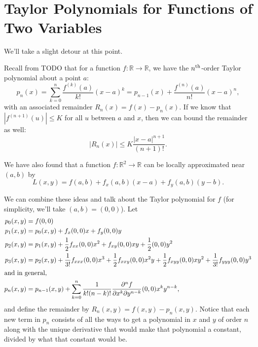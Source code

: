 \documentclass{amsart}
\newcommand{\BBR}{\mathbb{R}}
\newcommand{\abs}[1]{\left\lvert#1\right\rvert}
\begin{document}
\section*{Taylor Polynomials for Functions of Two Variables}

We'll take a slight detour at this point.

Recall from TODO that for a function $f:\BBR\to\BBR$, we have the $n\textsuperscript{th}$-order Taylor polynomial about a point $a$:
\[
 p_n(x)
 =\sum_{k=0}^n\frac{f^{(k)}(a)}{k!}(x-a)^k
 =p_{n-1}(x)+\frac{f^{(n)}(a)}{n!}(x-a)^n,
\]
with an associated remainder $R_n(x)=f(x)-p_n(x)$.  If we know that $\abs{f^{(n+1)}(u)}\le K$ for all $u$ between $a$ and $x$, then we can bound the remainder as well:
\[\abs{R_n(x)}\le K\frac{\abs{x-a}^{n+1}}{(n+1)!}.\]

We have also found that a function $f\colon\BBR^2\to\BBR$ can be locally approximated near $(a,b)$ by
\[ L(x,y)=f(a,b)+f_x(a,b)(x-a)+f_y(a,b)(y-b). \]

We can combine these ideas and talk about the Taylor polynomial for $f$ (for simplicity, we'll take $(a,b)=(0,0)$). Let
\begin{align*}
 p_0(x,y)&=f(0,0) \\
 p_1(x,y)&=p_0(x,y)+f_x(0,0)x+f_y(0,0)y \\
 p_2(x,y)&=p_1(x,y)+\frac12f_{xx}(0,0)x^2+f_{xy}(0,0)xy+\frac12(0,0)y^2 \\
 p_3(x,y)&=p_2(x,y)+\frac1{3!}f_{xxx}(0,0)x^3+\frac12f_{xxy}(0,0)x^2y
 +\frac12f_{xyy}(0,0)xy^2+\frac1{3!}f_{yyy}(0,0)y^3 \\
 \intertext{and in general,}
 p_n(x,y)&=p_{n-1}(x,y)+\sum_{k=0}^n\frac1{k!(n-k)!}
 \frac{\partial^n f}{\partial x^k\partial y^{n-k}}(0,0)x^k y^{n-k},
\end{align*}
and define the remainder by $R_n(x,y)=f(x,y)-p_n(x,y)$. Notice that each new term in $p_n$ consists of all the ways to get a polynomial in $x$ and $y$ of order $n$ along with the unique derivative that would make that polynomial a constant, divided by what that constant would be.
\end{document}
